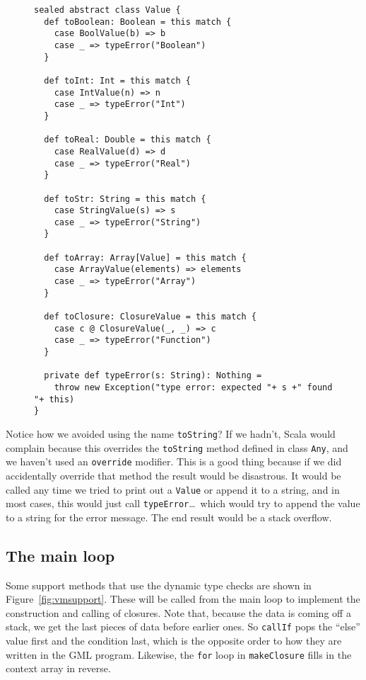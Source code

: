 \begin{figure}
\begin{verbatim}
sealed abstract class Value {
  def toBoolean: Boolean = this match {
    case BoolValue(b) => b
    case _ => typeError("Boolean")
  }

  def toInt: Int = this match {
    case IntValue(n) => n
    case _ => typeError("Int")
  }

  def toReal: Double = this match {
    case RealValue(d) => d
    case _ => typeError("Real")
  }

  def toStr: String = this match {
    case StringValue(s) => s
    case _ => typeError("String")
  }

  def toArray: Array[Value] = this match {
    case ArrayValue(elements) => elements
    case _ => typeError("Array")
  }

  def toClosure: ClosureValue = this match {
    case c @ ClosureValue(_, _) => c
    case _ => typeError("Function")
  }

  private def typeError(s: String): Nothing =
    throw new Exception("type error: expected "+ s +" found "+ this)
}
\end{verbatim}
\getcaption
\end{figure}

Notice how we avoided using the name \verb!toString!?
If we hadn't,
Scala would complain because this overrides the \verb!toString! method
defined in class \verb!Any!,
and we haven't used an \verb!override! modifier.
This is a good thing because if we did accidentally override that method
the result would be disastrous.
It would be called any time we tried to print out a \verb!Value!
or append it to a string, and in most cases,
this would just call \verb!typeError!\ldots\ which would
try to append the value to a string for the error message.
The end result would be a stack overflow.


\subsection{The main loop\label{sec:mainloop}}

Some support methods that use the dynamic type checks
are shown in Figure~\ref{fig:vmsupport}.
These will be called from the main loop to implement
the construction and calling of closures.
Note that, because the data is coming off a stack,
we get the last pieces of data before earlier ones.
So \verb!callIf! pops the ``else'' value first and the condition last,
which is the opposite order to how they are written in the GML program.
Likewise, the \verb!for! loop in \verb!makeClosure!
fills in the context array in reverse.

